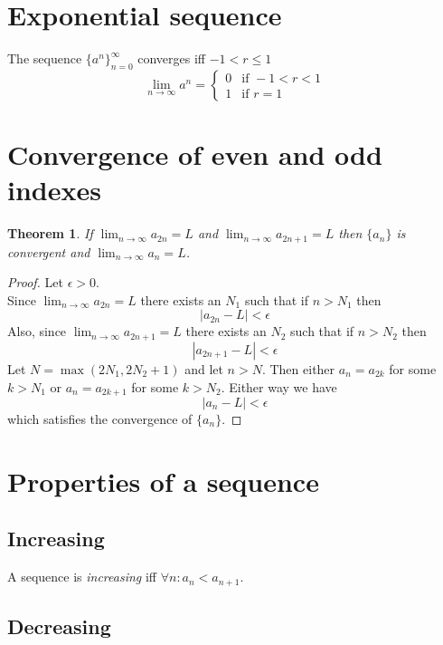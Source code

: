 \documentclass{article}
\begin{document}
\section{Exponential sequence} %

The sequence \({\{a^n\}}_{n=0}^\infty\) converges iff \(-1<r\leq 1\)
\[
    \lim_{n\to\infty} a^n = \begin{cases}
        0 & \text{if } -1 < r < 1 \\
        1 & \text{if } r=1
    \end{cases}
\]

\pagebreak

\section{Convergence of even and odd indexes}

\newtheorem*{theorem1}{Theorem}

\begin{theorem1}
    If \(\lim_{n\to\infty}a_{2n}=L\) and \(\lim_{n\to\infty}a_{2n+1}=L\)
    then \(\{a_n\}\) is convergent and \(\lim_{n\to\infty}a_n=L\).
\end{theorem1}
\begin{proof}
    Let \(\epsilon>0\). \\
    Since \(\lim_{n\to\infty}a_{2n}=L\) there exists an \(N_1\) such that
    if \(n>N_1\) then
    \[
        |a_{2n}-L|<\epsilon
    \]
    Also, since \(\lim_{n\to\infty}a_{2n+1}=L\) there exists an \(N_2\) such that
    if \(n>N_2\) then
    \[
        |a_{2n+1}-L|<\epsilon
    \]
    Let \(N=\max(2N_1, 2N_2+1)\) and let \(n>N\).
    Then either \(a_n=a_{2k}\) for some \(k>N_1\) or \(a_n=a_{2k+1}\)
    for some \(k>N_2\). Either way we have
    \[
        |a_n-L|<\epsilon
    \]
    which satisfies the convergence of \(\{a_n\}\).
\end{proof}

\section{Properties of a sequence}

\subsection{Increasing}

A sequence is \textit{increasing} iff \(\forall n:  a_n<a_{n+1}\).

\subsection{Decreasing}
\end{document}
